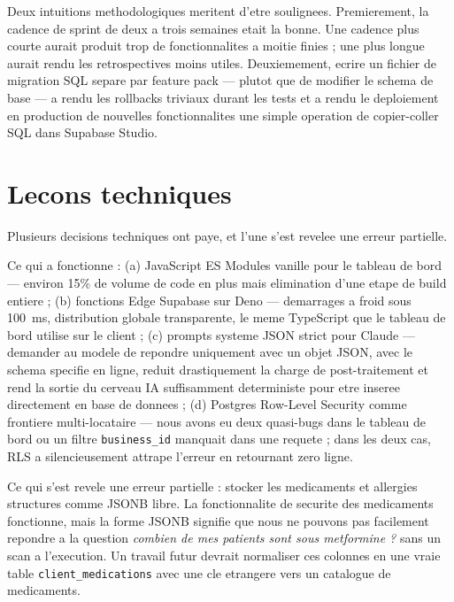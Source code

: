 Deux intuitions methodologiques meritent d'etre soulignees.
Premierement, la cadence de sprint de deux a trois semaines etait la
bonne. Une cadence plus courte aurait produit trop de fonctionnalites
a moitie finies ; une plus longue aurait rendu les retrospectives
moins utiles. Deuxiemement, ecrire un fichier de migration SQL separe
par feature pack --- plutot que de modifier le schema de base ---
a rendu les rollbacks triviaux durant les tests et a rendu le
deploiement en production de nouvelles fonctionnalites une simple
operation de copier-coller SQL dans Supabase Studio.

\section*{Lecons techniques}
Plusieurs decisions techniques ont paye, et l'une s'est revelee une
erreur partielle.

Ce qui a fonctionne : (a) JavaScript ES Modules vanille pour le
tableau de bord --- environ 15\% de volume de code en plus mais
elimination d'une etape de build entiere ; (b) fonctions Edge
Supabase sur Deno --- demarrages a froid sous 100~ms, distribution
globale transparente, le meme TypeScript que le tableau de bord
utilise sur le client ; (c) prompts systeme JSON strict pour Claude
--- demander au modele de repondre uniquement avec un objet JSON,
avec le schema specifie en ligne, reduit drastiquement la charge de
post-traitement et rend la sortie du cerveau IA suffisamment
deterministe pour etre inseree directement en base de donnees ; (d)
Postgres Row-Level Security comme frontiere multi-locataire --- nous
avons eu deux quasi-bugs dans le tableau de bord ou un filtre
\texttt{business\_id} manquait dans une requete ; dans les deux cas,
RLS a silencieusement attrape l'erreur en retournant zero ligne.

Ce qui s'est revele une erreur partielle : stocker les medicaments et
allergies structures comme JSONB libre. La fonctionnalite de securite
des medicaments fonctionne, mais la forme JSONB signifie que nous ne
pouvons pas facilement repondre a la question \emph{\og combien de mes
patients sont sous metformine ? \fg{}} sans un scan a l'execution. Un
travail futur devrait normaliser ces colonnes en une vraie table
\texttt{client\_medications} avec une cle etrangere vers un catalogue
de medicaments.

